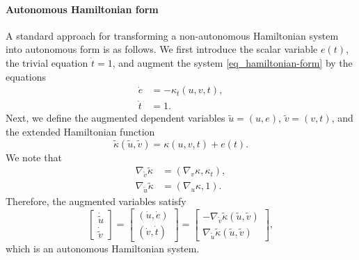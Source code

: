 \documentclass[11pt]{article}
\begin{document}
\paragraph{Autonomous Hamiltonian form}
A standard approach for transforming a non-autonomous Hamiltonian system into autonomous form is as
follows. We first introduce the scalar variable $e(t)$, the trivial equation $\dot{t}=1$, and augment the
system \eqref{eq_hamiltonian-form} by the equations
\begin{align*}
  \dot{e} &= -\kappa_t(u,v,t),\\
  \dot{t} &= 1.
\end{align*}
Next, we define the augmented dependent variables $\tilde{u} = (u, e)$, $\tilde{v}=(v, t)$, and
the extended Hamiltonian function
\[
\tilde{\kappa}(\tilde{u},\tilde{v}) = \kappa(u,v,t) + e(t).
\]
We note that
\begin{align*}
  \nabla_{\tilde{v}} \tilde{\kappa} &= (\nabla_v \kappa, \kappa_t),\\
  \nabla_{\tilde{u}} \tilde{\kappa} &= (\nabla_u \kappa, 1).
\end{align*}
Therefore, the augmented variables satisfy
\[
\begin{bmatrix}
  \dot{\tilde{u}} \\
  \dot{\tilde{v}}
\end{bmatrix} =
%
\begin{bmatrix}
  (\dot{u}, \dot{e}) \\
  (\dot{v}, \dot{t})
\end{bmatrix} =
%
\begin{bmatrix}
  -\nabla_{\tilde{v}} \tilde{\kappa}(\tilde{u}, \tilde{v})\\
  \nabla_{\tilde{u}} \tilde{\kappa}(\tilde{u}, \tilde{v})
\end{bmatrix},
\]
which is an autonomous Hamiltonian system.  
\end{document}
